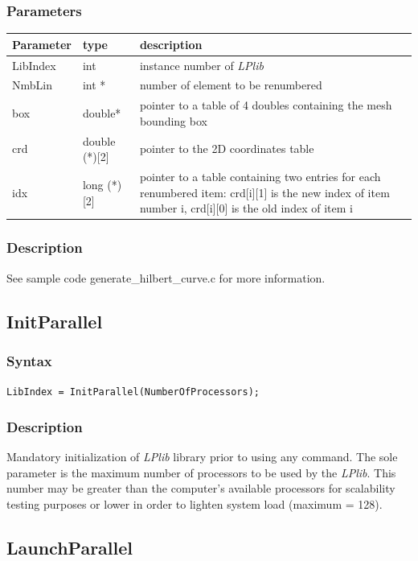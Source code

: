 \documentclass[a4paper,12pt]{article}
\begin{document}
\subsubsection*{Parameters}
\begin{tabular}{|m{2cm}|m{3cm}|m{8cm}|}
\hline
Parameter  & type   & description \\
\hline
LibIndex   & int    & instance number of \emph{LPlib} \\
\hline
NmbLin     & int * & number of element to be renumbered \\
\hline
box        & double* & pointer to a table of 4 doubles containing the mesh bounding box \\
\hline
crd        & double (*)[2] & pointer to the 2D coordinates table \\
\hline
idx        & long (*)[2] & pointer to a table containing two entries for each renumbered item: crd[i][1] is the new index of item number i, crd[i][0] is the old index of item i \\
\hline
\end{tabular}

\subsubsection*{Description}
See sample code generate\_hilbert\_curve.c for more information.


\subsection{InitParallel}

\subsubsection*{Syntax}
\tt{LibIndex = InitParallel(NumberOfProcessors);}
\normalfont

\subsubsection*{Description}
Mandatory initialization of \emph{LPlib} library prior to using any command. The sole parameter is the maximum number of processors to be used by the \emph{LPlib}. This number may be greater than the computer's available processors for scalability testing purposes or lower in order to lighten system load (maximum = 128).


\subsection{LaunchParallel}
\end{document}
